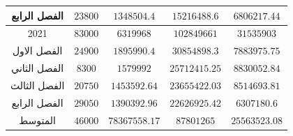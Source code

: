 \documentclass[10pt,a4paper]{report}
\begin{document}
\begin{longtable}{|c|c|c|c|c|}
	الفصل الرابع & $23800$              & $1348504.4$      & $15216488.6$   & $6806217.44$       \\ \hline
	2021         & $83000$              & $6319968$        & $102849661$    & $31535903$         \\ \hline
	الفصل الاول  & $24900$              & $1895990.4$      & $30854898.3$   & $7883975.75$       \\ \hline
	الفصل الثاني & $8300$               & $1579992$        & $25712415.25$  & $8830052.84$       \\ \hline
	الفصل الثالث & $20750$              & $1453592.64$     & $23655422.03$  & $8514693.81$       \\ \hline
	الفصل الرابع & $29050$              & $1390392.96$     & $22626925.42$  & $6307180.6$        \\ \hline
	\rowcolor[HTML]{DAE8FC} 
	المتوسط      & $46000$              & $78367558.17$    & $87801265$     & $25563523.08$      \\ \hline
	
	
	
	
\end{longtable}
\end{document}
